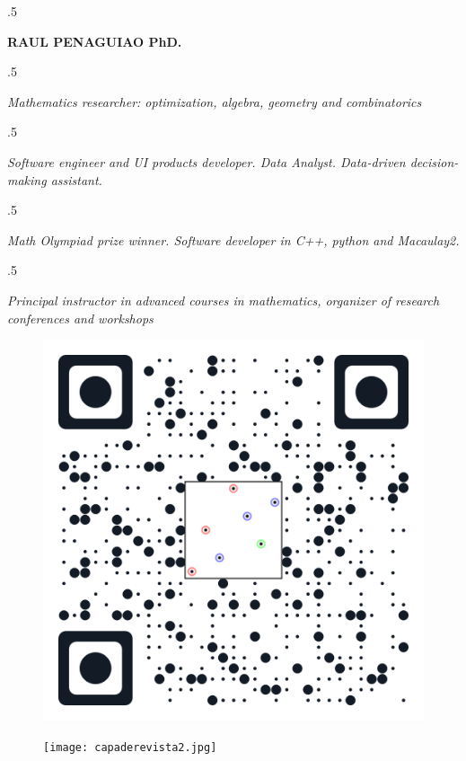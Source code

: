 \documentclass[margin, 10pt]{res} %
\begin{document}

\moveleft.5\hoffset\centerline{{\Huge\bf RAUL PENAGUIAO PhD.}} %
\vspace{1.5mm}
\moveleft.5\hoffset\centerline{{\it Mathematics researcher: optimization, algebra, geometry and combinatorics}}

\moveleft.5\hoffset\centerline{{\it Software engineer and UI products developer. Data Analyst. Data-driven decision-making assistant.}}

\moveleft.5\hoffset\centerline{{\it  Math Olympiad prize winner. Software developer in C++, python and Macaulay2.}}

\moveleft.5\hoffset\centerline{{ \it Principal instructor in advanced courses in mathematics, organizer of research conferences and workshops}} %

\begin{figure}
\centering
\begin{minipage}{.5\textwidth}
  \centering
  \includegraphics[width=.4\linewidth, left]{websiteQRcode.png}
\end{minipage}%
\begin{minipage}{.5\textwidth}
  \centering
  \texttt{[image: capaderevista2.jpg]}
\end{minipage}
\end{figure}


 
\end{document}
